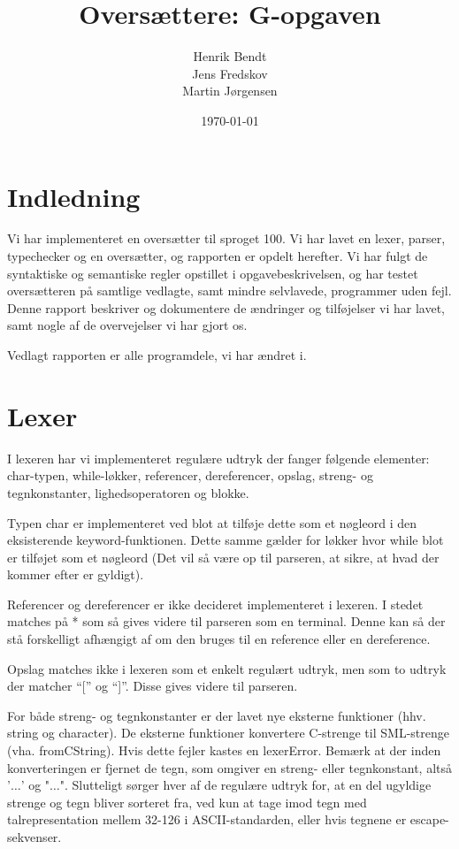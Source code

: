 \documentclass[a4paper, 10pt]{article}
\author{Henrik Bendt \\ Jens Fredskov \\ Martin Jørgensen}
\title{Oversættere: G-opgaven}
\date{\today}
\begin{document}
\maketitle
\pagebreak
\tableofcontents
\pagebreak

\section{Indledning}
Vi har implementeret en oversætter til sproget 100. Vi har lavet en lexer,
parser, typechecker og en oversætter, og rapporten er opdelt herefter.
Vi har fulgt de syntaktiske og semantiske regler opstillet i opgavebeskrivelsen,
og har testet oversætteren på samtlige vedlagte, samt mindre selvlavede,
programmer uden fejl. Denne rapport beskriver og dokumentere de ændringer og
tilføjelser vi har lavet, samt nogle af de overvejelser vi har gjort os.

Vedlagt rapporten er alle programdele, vi har ændret i.

\section{Lexer}
I lexeren har vi implementeret regulære udtryk der fanger følgende elementer:
char-typen, while-løkker, referencer, dereferencer, opslag, streng- og tegnkonstanter,
lighedsoperatoren og blokke.

Typen char er implementeret ved blot at tilføje dette som et nøgleord i den
eksisterende keyword-funktionen. Dette samme gælder for løkker hvor while blot
er tilføjet som et nøgleord (Det vil så være op til parseren, at sikre, at hvad
der kommer efter er gyldigt).

Referencer og dereferencer er ikke decideret implementeret i lexeren. I stedet
matches på * som så gives videre til parseren som en terminal. Denne kan så
der stå forskelligt afhængigt af om den bruges til en reference eller en
dereference.

Opslag matches ikke i lexeren som et enkelt regulært udtryk, men som to udtryk
der matcher ``['' og ``]''. Disse gives videre til parseren.

For både streng- og tegnkonstanter er der lavet nye eksterne funktioner (hhv.
string og character). De eksterne funktioner konvertere C-strenge til
SML-strenge (vha. fromCString). Hvis dette fejler kastes en lexerError. Bemærk
at der inden konverteringen er fjernet de tegn, som omgiver en streng- eller
tegnkonstant, altså '$\ldots$' og "$\ldots$". Slutteligt sørger hver af de
regulære udtryk for, at en del ugyldige strenge og tegn bliver sorteret
fra, ved kun at tage imod tegn med talrepresentation mellem 32-126 i ASCII-standarden, eller hvis tegnene er escape-sekvenser.
\end{document}
